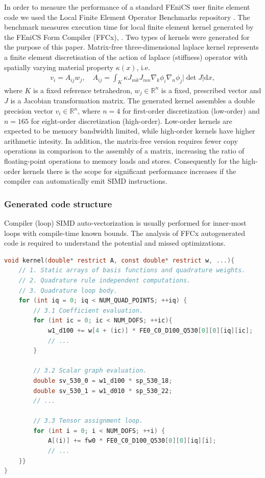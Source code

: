 In order to measure the performance of a standard FEniCS user finite element
code we used the Local Finite Element Operator Benchmarks repository
\cite{Baratta2023}. The benchmark measures execution time for local finite
element kernel generated by the FEniCS Form Compiler (FFCx), \cite{Habera2020}.
Two types of kernels were generated for the purpose of this paper. Matrix-free
three-dimensional laplace kernel represents a finite element discretisation of
the action of laplace (stiffness) operator with spatially varying material
property $\kappa(x)$, i.e.
\begin{align}
    v_i = A_{ij} w_j, \quad
    A_{ij} = \int_K \kappa J_{mk} J_{mn} \nabla_k \phi_i \nabla_n \phi_j |\det J| \mathrm dx,
\end{align}
where $K$ is a fixed reference tetrahedron, $w_j \in \mathbb{R}^{n}$ is a fixed,
prescribed vector and $J$ is a Jacobian transformation matrix. The generated
kernel assembles a double precision vector $v_i \in \mathbb{R}^{n}$, where $n =
4$ for first-order discretization (low-order) and $n = 165$ for eight-order
discretization (high-order). Low-order kernels are expected to be memory
bandwidth limited, while high-order kernels have higher arithmetic intesity. In
addition, the matrix-free version requires fewer copy operations in comparison
to the assembly of a matrix, increasing the ratio of floating-point operations
to memory loads and stores. Consequently for the high-order kernels there is
the scope for significant performance increases if the compiler can
automatically emit SIMD instructions.

\subsubsection*{Generated code structure}

Compiler (loop) SIMD auto-vectorization is usually performed for inner-most loops
with compile-time known bounds. The analysis of FFCx autogenerated code is
required to understand the potential and missed optimizations.

\lstset{style=CStyle}
\begin{lstlisting}[language=c,
    caption=FFCx generated finite element kernel.,
    basicstyle=\ttfamily\footnotesize,
    keywordstyle=\ttb\color{deepblue}\footnotesize,
    label=lst:c-code]
void kernel(double* restrict A, const double* restrict w, ...){
    // 1. Static arrays of basis functions and quadrature weights.
    // 2. Quadrature rule independent computations.
    // 3. Quadrature loop body.
    for (int iq = 0; iq < NUM_QUAD_POINTS; ++iq) {
        // 3.1 Coefficient evaluation.
        for (int ic = 0; ic < NUM_DOFS; ++ic){
            w1_d100 += w[4 + (ic)] * FE0_C0_D100_Q530[0][0][iq][ic];
            // ...
        }

        // 3.2 Scalar graph evaluation.
        double sv_530_0 = w1_d100 * sp_530_18;
        double sv_530_1 = w1_d010 * sp_530_22;
        // ...

        // 3.3 Tensor assignment loop.
        for (int i = 0; i < NUM_DOFS; ++i) {
            A[(i)] += fw0 * FE0_C0_D100_Q530[0][0][iq][i];
            // ...
    }}
}
\end{lstlisting}

